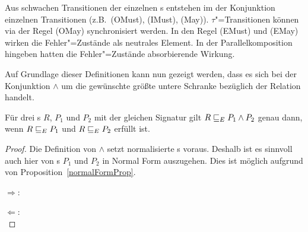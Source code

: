Aus schwachen Transitionen der einzelnen \MEIO{}s entstehen im der Konjunktion
einzelnen Transitionen (z.B.\ (OMust), (IMust), (May)). $\tau$"=Transitionen
können via der Regel (OMay) synchronisiert werden. In den Regel (EMust) und
(EMay) wirken die Fehler"=Zustände als neutrales Element. In der
Parallelkomposition hingeben hatten die Fehler"=Zustände absorbierende Wirkung.

Auf Grundlage dieser Definitionen kann nun gezeigt werden, dass es sich bei der
Konjunktion $\land$ um die gewünschte größte untere Schranke bezüglich der
Relation \ERel{} handelt.

\begin{Satz}[Konjunktion]
  Für drei \MEIO{}s $R$, $P_1$ und $P_2$ mit der gleichen Signatur gilt
  $R \sqsubseteq  _E P_1\land P_2$ genau dann, wenn $R \sqsubseteq  _E P_1$ und $R \sqsubseteq  _E P_2$ erfüllt
  ist.
\end{Satz}

\begin{proof}
  Die Definition von $\land$ setzt normalisierte \MEIO{}s voraus. Deshalb ist
  es sinnvoll auch hier von \MEIO{}s $P_1$ und $P_2$ in Normal Form auszugehen.
  Dies ist möglich aufgrund von Proposition~\ref{normalFormProp}.

  \glqq $\Rightarrow$\grqq{}:\\

  \glqq $\Leftarrow$\grqq{}:\\
\end{proof}
